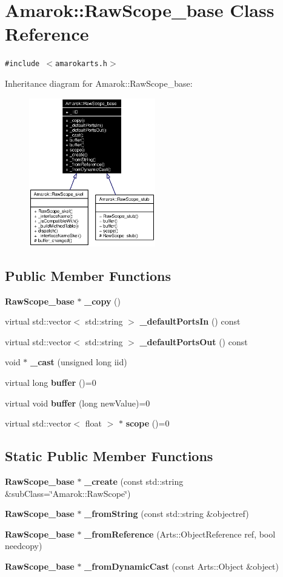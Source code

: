 \section{Amarok::Raw\-Scope\_\-base Class Reference}
\label{classAmarok_1_1RawScope__base}
{\tt \#include $<$amarokarts.h$>$}

Inheritance diagram for Amarok::Raw\-Scope\_\-base:\begin{figure}[H]
\begin{center}
\leavevmode
\includegraphics[width=156pt]{classAmarok_1_1RawScope__base__inherit__graph}
\end{center}
\end{figure}
\subsection*{Public Member Functions}
\begin{CompactItemize}
\item 
{\bf Raw\-Scope\_\-base} $\ast$ {\bf \_\-copy} ()
\item 
virtual std::vector$<$ std::string $>$ {\bf \_\-default\-Ports\-In} () const 
\item 
virtual std::vector$<$ std::string $>$ {\bf \_\-default\-Ports\-Out} () const 
\item 
void $\ast$ {\bf \_\-cast} (unsigned long iid)
\item 
virtual long {\bf buffer} ()=0
\item 
virtual void {\bf buffer} (long new\-Value)=0
\item 
virtual std::vector$<$ float $>$ $\ast$ {\bf scope} ()=0
\end{CompactItemize}
\subsection*{Static Public Member Functions}
\begin{CompactItemize}
\item 
{\bf Raw\-Scope\_\-base} $\ast$ {\bf \_\-create} (const std::string \&sub\-Class=\char`\"{}Amarok::Raw\-Scope\char`\"{})
\item 
{\bf Raw\-Scope\_\-base} $\ast$ {\bf \_\-from\-String} (const std::string \&objectref)
\item 
{\bf Raw\-Scope\_\-base} $\ast$ {\bf \_\-from\-Reference} (Arts::Object\-Reference ref, bool needcopy)
\item 
{\bf Raw\-Scope\_\-base} $\ast$ {\bf \_\-from\-Dynamic\-Cast} (const Arts::Object \&object)
\end{CompactItemize}
